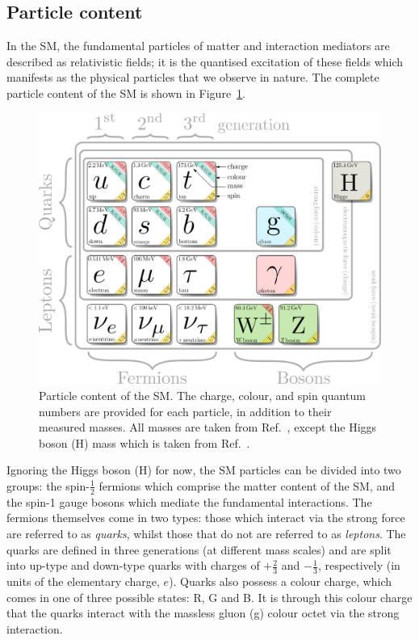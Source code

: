 \subsection{Particle content}\label{sec:sm_particlecontent}
In the SM, the fundamental particles of matter and interaction mediators are described as relativistic fields; it is the quantised excitation of these fields which manifests as the physical particles that we observe in nature. The complete particle content of the SM is shown in Figure~\ref{fig:sm_particlecontent}.

\begin{figure}[htb!]
  \centering
  \includegraphics[width=1\linewidth]{Figures/theory/sm_drawing.pdf}
  \caption[Particle content of the SM]
  {
    Particle content of the SM. The charge, colour, and spin quantum numbers are provided for each particle, in addition to their measured masses. All masses are taken from Ref.~\cite{Zyla:2020zbs}, except the Higgs boson (H) mass which is taken from Ref.~\cite{Sirunyan:2020xwk}.
  }
  \label{fig:sm_particlecontent}
\end{figure}

Ignoring the Higgs boson (H) for now, the SM particles can be divided into two groups: the spin-$\frac{1}{2}$ fermions which comprise the matter content of the SM, and the spin-1 gauge bosons which mediate the fundamental interactions. The fermions themselves come in two types: those which interact via the strong force are referred to as \textit{quarks}, whilst those that do not are referred to as \textit{leptons}. The quarks are defined in three generations (at different mass scales) and are split into up-type and down-type quarks with charges of $+\frac{2}{3}$ and $-\frac{1}{3}$, respectively (in units of the elementary charge, $e$). Quarks also possess a colour charge, which comes in one of three possible states: R, G and B. It is through this colour charge that the quarks interact with the massless gluon (g) colour octet via the strong interaction.

